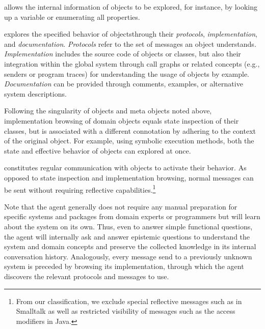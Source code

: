 \begin{description}[noextralabelsep]
	\item[State inspection] allows the internal information of objects to be explored, for instance, by looking up a variable or enumerating all properties.
	\item[Implementation browsing] explores the specified behavior of objects\linebreak{}through their \emph{protocols}, \emph{implementation}, and \emph{documentation}.
	\emph{Protocols} refer to the set of messages an object understands.
	\emph{Implementation} includes the source code of objects or classes, but also their integration within the global system through call graphs or related concepts (e.g., senders or program traces) for understanding the usage of objects by example.
	\emph{Documentation} can be provided through comments, examples, or alternative system descriptions.

	Following the singularity of objects and meta objects noted above, implementation browsing of domain objects equals state inspection of their classes, but is associated with a different connotation by adhering to the context of the original object.
	For example, using symbolic execution methods, both the state and effective behavior of objects can explored at once.
	\item[Message sending] constitutes regular communication with objects to activate their behavior.
	As opposed to state inspection and implementation browsing, normal messages can be sent without requiring reflective capabilities.\footnote{From our classification, we exclude special reflective messages such as  in Smalltalk as well as restricted visibility of messages such as the  access modifiers in Java.}
\end{description}

Note that the agent generally does not require any manual preparation for specific systems and packages from domain experts or programmers but will learn about the system on its own.
Thus, even to answer simple functional questions, the agent will internally ask and answer epistemic questions to understand the system and domain concepts and preserve the collected knowledge in its internal conversation history.
Analogously, every message send to a previously unknown system is preceded by browsing its implementation, through which the agent discovers the relevant protocols and messages to use.

